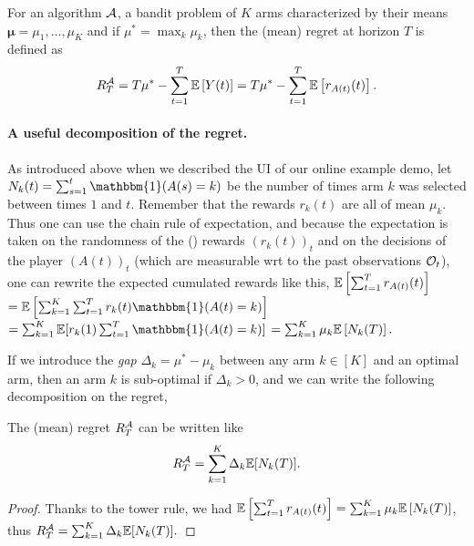 \begin{defn}[Regret]\label{def:2:regret}
    For an algorithm $\mathcal{A}$, a bandit problem of $K$ arms characterized by their means $\bm{\mu} = \mu_1,\dots,\mu_K$ and if $\mu^* = \max_k \mu_k$, then the (mean) regret at horizon $T$ is defined as
    \begin{equation}
        R_T^{\mathcal{A}} = T \mu^* - \sum_{t=1}^T \mathbb{E}\left[ Y(t) \right] = T \mu^* - \sum_{t=1}^T \mathbb{E}\left[ r_{A(t)}(t) \right].
    \end{equation}
\end{defn}


\paragraph{A useful decomposition of the regret.}
%
As introduced above when we described the UI of our online example demo, let $N_k(t) = \sum_{s=1}^t \mathbbm{1}(A(s) = k)$ be the number of times arm $k$ was selected between times $1$ and $t$.
Remember that the rewards $r_k(t)$ are all \iid{} of mean $\mu_k$.
Thus one can use the chain rule of expectation, and because the expectation is taken on the randomness of the (\iid) rewards $(r_k(t))_t$ and on the decisions of the player $(A(t))_t$ (which are measurable wrt to the past observations $\mathcal{O}_t$),
one can rewrite the expected cumulated rewards like this,
$\mathbb{E} \left[ \sum_{t=1}^T r_{A(t)}(t) \right]$
$= \E \left[ \sum_{k=1}^K \sum_{t=1}^T r_k(t) \mathbbm{1}(A(t) = k) \right]$
$= \sum_{k=1}^K \E [ r_k(1) \sum_{t=1}^T \mathbbm{1}(A(t) = k) ]$
$= \sum_{k=1}^K \mu_k \mathbb{E} \left[ N_k(T) \right].$

If we introduce the \emph{gap} $\Delta_k = \mu^* - \mu_k$ between any arm $k\in[K]$ and an optimal arm,
then an arm $k$ is sub-optimal if $\Delta_k > 0$, and we can write the following decomposition on the regret,

\begin{lemma}\label{lem:2:RegretDecomposition}
    The (mean) regret $R_T^{\mathcal{A}}$ can be written like
    \begin{equation}
        R_T^{\mathcal{A}} = \sum_{k=1}^K \Delta_k \mathbb{E}[ N_k(T) ].
    \end{equation}
\end{lemma}
%
\begin{proof}\label{proof:2:RegretDecomposition}
    Thanks to the tower rule, we had
    $\mathbb{E} \left[ \sum_{t=1}^T r_{A(t)}(t) \right] = \sum_{k=1}^K \mu_k \mathbb{E} \left[ N_k(T) \right]$, thus $R_T^{\mathcal{A}} = \sum_{k=1}^K \Delta_k \mathbb{E}[ N_k(T) ].$
\end{proof}


